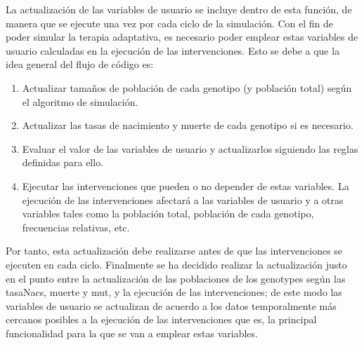 La actualización de las variables de usuario se incluye dentro de esta función, de manera que se ejecute una vez por cada ciclo de la simulación. Con el fin de poder simular la terapia adaptativa, es necesario poder emplear estas variables de usuario calculadas en la ejecución de las intervenciones. Esto se debe a que la idea general del flujo de código es:
\begin{enumerate}
	\item Actualizar tamaños de población de cada genotipo (y población total) según el algoritmo de simulación.
	\item Actualizar las tasas de nacimiento y muerte de cada genotipo si es necesario.
	\item Evaluar el valor de las variables de usuario y actualizarlos siguiendo las reglas definidas para ello.
	\item Ejecutar las intervenciones que pueden o no depender de estas variables. La ejecución de las intervenciones afectará a las variables de usuario y a otras variables tales como la población total, población de cada genotipo, frecuencias relativas, etc.
\end{enumerate} 
Por tanto, esta actualización debe realizarse antes de que las intervenciones se ejecuten en cada ciclo. Finalmente se ha decidido realizar la actualización justo en el punto entre la actualización de las poblaciones de los \glspl{genotype} según las \glspl{tasaNac}, muerte y \gls{mut}, y la ejecución de las intervenciones; de este modo las variables de usuario se actualizan de acuerdo a los datos temporalmente más cercanos posibles a la ejecución de las intervenciones que es, la principal funcionalidad para la que se van a emplear estas variables.

